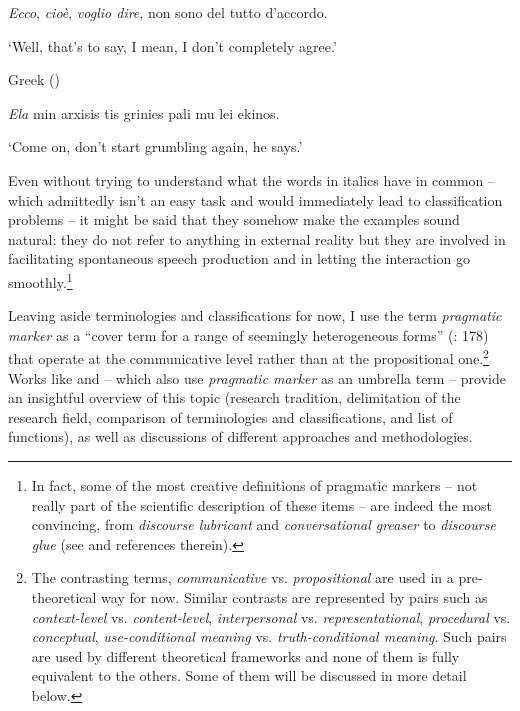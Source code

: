 \textit{Ecco}, \textit{cioè}, \textit{voglio dire}, non sono del tutto d’accordo.

\glt ‘Well, that’s to say, I mean, I don’t completely agree.’
    \z  

\ea%
    \label{ex:key:3} 

          Greek (\citealt[662]{NikiforidouEtAl2014})

\textit{Ela} min arxisis tis grinies pali mu lei ekinos.

\glt ‘Come on, don’t start grumbling again, he says.’
    \z  

Even without trying to understand what the words in italics have in common – which admittedly isn’t an easy task and would immediately lead to classification problems – it might be said that they somehow make the examples sound natural: they do not refer to anything in external reality but they are involved in facilitating spontaneous speech production and in letting the interaction go smoothly.\footnote{In fact, some of the most creative definitions of pragmatic markers – not really part of the scientific description of these items – are indeed the most convincing, from \textit{discourse lubricant} and \textit{conversational greaser} to \textit{discourse glue} (see \citealt[1]{Brinton1996} and references therein).}

Leaving aside terminologies and classifications for now, I use the term \textit{pragmatic marker} as a “cover term for a range of seemingly heterogeneous forms” (\citealt{HansenRossari2005}: 178) that operate at the communicative level rather than at the propositional one.\footnote{The contrasting terms, \textit{communicative} vs. \textit{propositional} are used in a pre-theoretical way for now. Similar contrasts are represented by pairs such as \textit{context-level} vs. \textit{content-level}, \textit{interpersonal} vs. \textit{representational}, \textit{procedural} vs. \textit{conceptual}, \textit{use-conditional meaning} vs. \textit{truth-conditional meaning}. Such pairs are used by different theoretical frameworks and none of them is fully equivalent to the others. Some of them will be discussed in more detail below.}  Works like \citet[29--40]{Brinton1996} and \citet{AijmerSimon-Vandenbergen2011} – which also use \textit{pragmatic marker} as an umbrella term – provide an insightful overview of this topic (research tradition, delimitation of the research field, comparison of terminologies and classifications, and list of functions), as well as discussions of different approaches and methodologies.

